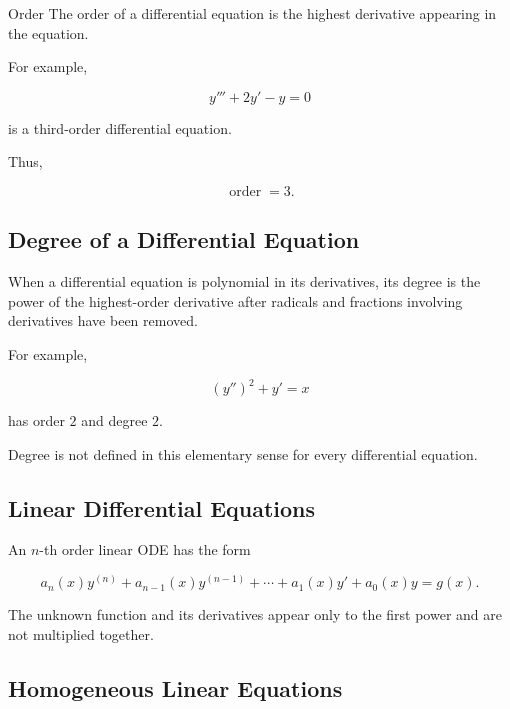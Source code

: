 \begin{definitionbox}{Order}
The order of a differential equation is the highest derivative appearing
in the equation.
\end{definitionbox}

For example,

\[
y'''+2y'-y=0
\]

is a third-order differential equation.

Thus,

\[
\boxed{
\operatorname{order}=3.
}
\]

\subsection{Degree of a Differential Equation}
\label{subsec:ode-degree}

When a differential equation is polynomial in its derivatives, its
degree is the power of the highest-order derivative after radicals and
fractions involving derivatives have been removed.

For example,

\[
\boxed{
(y'')^2+y'=x
}
\]

has order \(2\) and degree \(2\).

Degree is not defined in this elementary sense for every differential
equation.

\subsection{Linear Differential Equations}
\label{subsec:linear-odes}

An \(n\)-th order linear ODE has the form

\[
\boxed{
a_n(x)y^{(n)}
+
a_{n-1}(x)y^{(n-1)}
+
\cdots
+
a_1(x)y'
+
a_0(x)y
=
g(x).
}
\]

The unknown function and its derivatives appear only to the first power
and are not multiplied together.

\subsection{Homogeneous Linear Equations}
\label{subsec:homogeneous-linear-odes}

